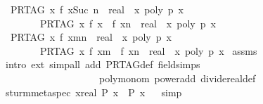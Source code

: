 \begin{isabellebody}
\ \ {\isachardoublequoteopen}PR{\isacharunderscore}TAG\ {\isacharparenleft}{\isasymlambda}x{\isachardot}\ {\isacharparenleft}f\ x{\isacharparenright}{\isacharcircum}Suc\ n\ {\isacharcolon}{\isacharcolon}\ real{\isacharparenright}\ {\isacharequal}\ {\isacharparenleft}{\isasymlambda}x{\isachardot}\ poly\ p\ x{\isacharparenright}\isanewline
\ \ \ \ \ \ \ {\isasymLongrightarrow}\ PR{\isacharunderscore}TAG\ {\isacharparenleft}{\isasymlambda}x{\isachardot}\ f\ x\ {\isacharasterisk}\ {\isacharparenleft}f\ x{\isacharparenright}{\isacharcircum}n\ {\isacharcolon}{\isacharcolon}\ real{\isacharparenright}\ {\isacharequal}\ {\isacharparenleft}{\isasymlambda}x{\isachardot}\ poly\ p\ x{\isacharparenright}{\isachardoublequoteclose}\isanewline
\ \ {\isachardoublequoteopen}PR{\isacharunderscore}TAG\ {\isacharparenleft}{\isasymlambda}x{\isachardot}\ {\isacharparenleft}f\ x{\isacharparenright}{\isacharcircum}{\isacharparenleft}m{\isacharplus}n{\isacharparenright}\ {\isacharcolon}{\isacharcolon}\ real{\isacharparenright}\ {\isacharequal}\ {\isacharparenleft}{\isasymlambda}x{\isachardot}\ poly\ p\ x{\isacharparenright}\isanewline
\ \ \ \ \ \ \ {\isasymLongrightarrow}\ PR{\isacharunderscore}TAG\ {\isacharparenleft}{\isasymlambda}x{\isachardot}\ {\isacharparenleft}f\ x{\isacharparenright}{\isacharcircum}m\ {\isacharasterisk}\ {\isacharparenleft}f\ x{\isacharparenright}{\isacharcircum}n\ {\isacharcolon}{\isacharcolon}\ real{\isacharparenright}\ {\isacharequal}\ {\isacharparenleft}{\isasymlambda}x{\isachardot}\ poly\ p\ x{\isacharparenright}{\isachardoublequoteclose}\isanewline
%
\isadelimproof
%
\endisadelimproof
%
\isatagproof
{}\isamarkupfalse%
\ assms\ \isamarkupfalse%
\ {\isacharparenleft}intro\ ext{\isacharcomma}\ simp{\isacharunderscore}all\ add{\isacharcolon}\ PR{\isacharunderscore}TAG{\isacharunderscore}def\ field{\isacharunderscore}simps\ \isanewline
\ \ \ \ \ \ \ \ \ \ \ \ \ \ \ \ \ \ \ \ poly{\isacharunderscore}monom\ power{\isacharunderscore}add\ divide{\isacharunderscore}real{\isacharunderscore}def{\isacharparenright}%
\endisatagproof
{\isafoldproof}%
%
\isadelimproof
\isanewline
%
\endisadelimproof
\isanewline
{}\isamarkupfalse%
\ sturm{\isacharunderscore}meta{\isacharunderscore}spec{\isacharcolon}\ {\isachardoublequoteopen}{\isacharparenleft}{\isasymAnd}x{\isacharcolon}{\isacharcolon}real{\isachardot}\ P\ x{\isacharparenright}\ {\isasymLongrightarrow}\ P\ x{\isachardoublequoteclose}%
\isadelimproof
\ %
\endisadelimproof
%
\isatagproof
{}\isamarkupfalse%
\ simp%
\endisatagproof
{\isafoldproof}%
%
\isadelimproof

\end{isabellebody}
